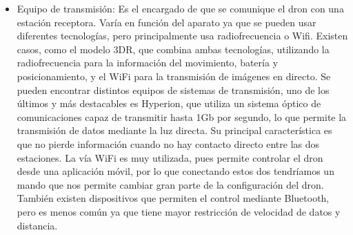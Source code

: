 \begin{itemize}
\item Equipo de transmisión: Es el encargado de que se comunique el dron con una estación receptora. Varía en función del aparato ya que se pueden usar diferentes tecnologías, pero principalmente usa radiofrecuencia o Wifi. Existen casos, como el modelo 3DR, que combina ambas tecnologías, utilizando la radiofrecuencia para la información del movimiento, batería y posicionamiento, y el WiFi para la transmisión de imágenes en directo. Se pueden encontrar distintos equipos de sistemas de transmisión, uno de los últimos y más destacables es Hyperion, que utiliza un sistema óptico de comunicaciones capaz de transmitir hasta 1Gb por segundo, lo que permite la transmisión de datos mediante la luz directa. Su principal característica es que no pierde información cuando no hay contacto directo entre las dos estaciones. La vía WiFi es muy utilizada, pues permite controlar el dron desde una aplicación móvil, por lo que conectando estos dos tendríamos un mando que nos permite cambiar gran parte de la configuración del dron. También existen dispositivos que permiten el control mediante Bluetooth, pero es menos común ya que tiene mayor restricción de velocidad de datos y distancia.


\end{itemize}
